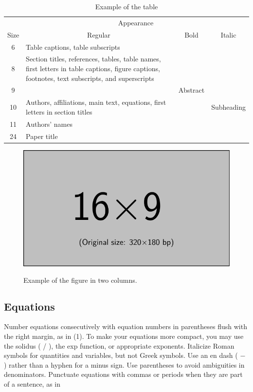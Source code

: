 \documentclass[dvipdfmx,conference,a4paper,nofonttune]{APSIPA}
\begin{document}
\begin{table}[t]
   \centering
   \caption{Example of the table}
   \begin{tabular}{|c|p{40mm}|c|c|}
\hline
& \multicolumn{3}{c|}{Appearance}\\
\cline{2-4}
Size & \multicolumn{1}{c|}{Regular} & Bold & Italic \\
\hline
6 & Table captions, table subscripts & & \\
\cline{2-4}
8 & Section titles, references, tables, table names, first letters in table 
captions, figure captions, footnotes, text subscripts, and superscripts & & \\
\cline{2-4}
9 & & Abstract & \\
\cline{2-4}
10 & Authors, affiliations, main text, equations, first letters in section titles & & Subheading \\
\cline{2-4}
11 & Authors' names & & \\
\cline{2-4}
24 & Paper title   & & \\
\hline
   \end{tabular}
\end{table}

\begin{figure}[t]
   \centering
   \includegraphics[width=.6\hsize]{figure/example-image-16x9.pdf} \\
   \caption{Example of the figure in two columns.}
\end{figure}

\subsection{Equations}

Number equations consecutively with equation numbers in parentheses
flush with the right margin, as in (1).  To make your equations more
compact, you may use the solidus ( / ), the exp function, or
appropriate exponents.  Italicize Roman symbols for quantities and
variables, but not Greek symbols.  Use an en dash ( $-$ ) rather than
a hyphen for a minus sign.  Use parentheses to avoid ambiguities in
denominators.  Punctuate equations with commas or periods when they
are part of a sentence, as in
\end{document}

